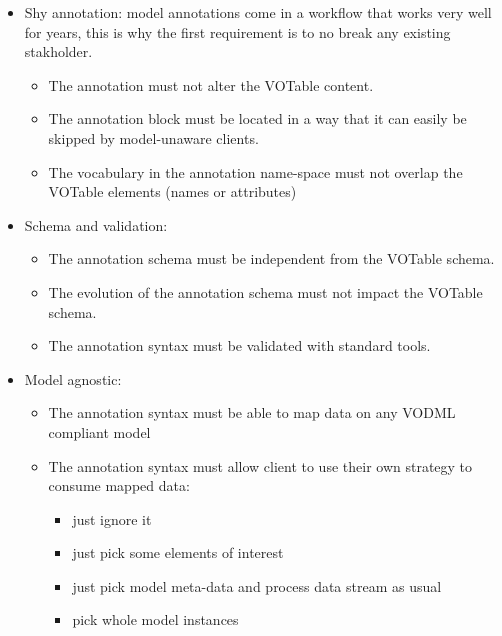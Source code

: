 \begin {itemize}
  \item Shy annotation: model annotations come in a workflow that works very well for years, this is why the first requirement is to no break any existing stakholder.
  \begin {itemize}
    \item The annotation must not alter the VOTable content.
    \item The annotation block must be located in a way that it can easily be skipped by model-unaware clients.
    \item The vocabulary in the annotation name-space must not overlap the VOTable elements (names or attributes)    
  \end {itemize}
  
  \item Schema and validation:
  \begin {itemize}
    \item The annotation schema must be independent from the VOTable schema.
    \item The evolution of the annotation schema must not impact the VOTable schema.
    \item The annotation syntax must be validated with standard tools.
  \end {itemize}
  
  \item Model agnostic:
  \begin {itemize}
    \item The annotation syntax must be able to map data on any VODML compliant model
    \item The annotation syntax must allow client to use their own strategy to consume mapped data:
      \begin {itemize}
        \item just ignore it
        \item just pick some elements of interest 
        \item just pick model meta-data and process data stream as usual
        \item pick whole model instances
      \end {itemize}
  \end {itemize}
  
\end {itemize}
